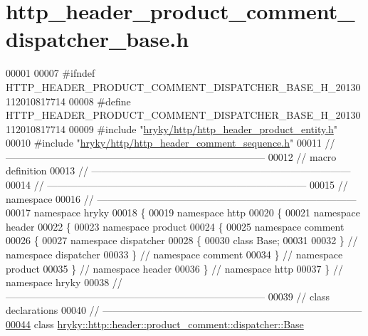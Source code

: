 \hypertarget{http__header__product__comment__dispatcher__base_8h_source}{\section{http\-\_\-header\-\_\-product\-\_\-comment\-\_\-dispatcher\-\_\-base.\-h}
}

\begin{DoxyCode}
00001 
00007 \textcolor{preprocessor}{#ifndef HTTP\_HEADER\_PRODUCT\_COMMENT\_DISPATCHER\_BASE\_H\_20130112010817714}
00008 \textcolor{preprocessor}{}\textcolor{preprocessor}{#define HTTP\_HEADER\_PRODUCT\_COMMENT\_DISPATCHER\_BASE\_H\_20130112010817714}
00009 \textcolor{preprocessor}{}\textcolor{preprocessor}{#include "\hyperlink{http__header__product__entity_8h}{hryky/http/http_header_product_entity.h}"}
00010 \textcolor{preprocessor}{#include "\hyperlink{http__header__comment__sequence_8h}{hryky/http/http_header_comment_sequence.h}"}
00011 \textcolor{comment}{//
      ------------------------------------------------------------------------------}
00012 \textcolor{comment}{// macro definition}
00013 \textcolor{comment}{//
      ------------------------------------------------------------------------------}
00014 \textcolor{comment}{//
      ------------------------------------------------------------------------------}
00015 \textcolor{comment}{// namespace}
00016 \textcolor{comment}{//
      ------------------------------------------------------------------------------}
00017 \textcolor{keyword}{namespace }hryky
00018 \{
00019 \textcolor{keyword}{namespace }http
00020 \{
00021 \textcolor{keyword}{namespace }header
00022 \{
00023 \textcolor{keyword}{namespace }product
00024 \{
00025 \textcolor{keyword}{namespace }comment
00026 \{
00027 \textcolor{keyword}{namespace }dispatcher
00028 \{
00030     \textcolor{keyword}{class }Base;
00031 
00032 \} \textcolor{comment}{// namespace dispatcher}
00033 \} \textcolor{comment}{// namespace comment}
00034 \} \textcolor{comment}{// namespace product}
00035 \} \textcolor{comment}{// namespace header}
00036 \} \textcolor{comment}{// namespace http}
00037 \} \textcolor{comment}{// namespace hryky}
00038 \textcolor{comment}{//
      ------------------------------------------------------------------------------}
00039 \textcolor{comment}{// class declarations}
00040 \textcolor{comment}{//
      ------------------------------------------------------------------------------}
\hypertarget{http__header__product__comment__dispatcher__base_8h_source_l00044}{}\hyperlink{classhryky_1_1http_1_1header_1_1product__comment_1_1dispatcher_1_1_base}{00044} \textcolor{comment}{}\textcolor{keyword}{class }\hyperlink{classhryky_1_1http_1_1header_1_1product__comment_1_1dispatcher_1_1_base}{hryky::http::header::product_comment::dispatcher::Base}

\end{DoxyCode}
